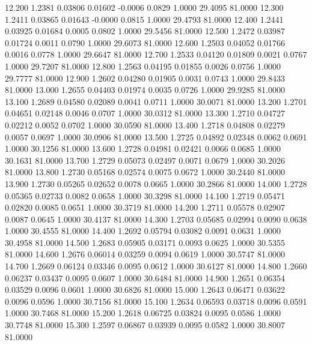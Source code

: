   12.200   1.2381   0.03806   0.01602  -0.0006   0.0829   1.0000  29.4095  81.0000
  12.300   1.2411   0.03865   0.01643  -0.0000   0.0815   1.0000  29.4793  81.0000
  12.400   1.2441   0.03925   0.01684   0.0005   0.0802   1.0000  29.5456  81.0000
  12.500   1.2472   0.03987   0.01724   0.0011   0.0790   1.0000  29.6073  81.0000
  12.600   1.2503   0.04052   0.01766   0.0016   0.0778   1.0000  29.6647  81.0000
  12.700   1.2533   0.04120   0.01809   0.0021   0.0767   1.0000  29.7207  81.0000
  12.800   1.2563   0.04195   0.01855   0.0026   0.0756   1.0000  29.7777  81.0000
  12.900   1.2602   0.04280   0.01905   0.0031   0.0743   1.0000  29.8433  81.0000
  13.000   1.2655   0.04403   0.01974   0.0035   0.0726   1.0000  29.9285  81.0000
  13.100   1.2689   0.04580   0.02089   0.0041   0.0711   1.0000  30.0071  81.0000
  13.200   1.2701   0.04651   0.02148   0.0046   0.0707   1.0000  30.0312  81.0000
  13.300   1.2710   0.04727   0.02212   0.0052   0.0702   1.0000  30.0590  81.0000
  13.400   1.2718   0.04808   0.02279   0.0057   0.0697   1.0000  30.0906  81.0000
  13.500   1.2725   0.04892   0.02348   0.0062   0.0691   1.0000  30.1256  81.0000
  13.600   1.2728   0.04981   0.02421   0.0066   0.0685   1.0000  30.1631  81.0000
  13.700   1.2729   0.05073   0.02497   0.0071   0.0679   1.0000  30.2026  81.0000
  13.800   1.2730   0.05168   0.02574   0.0075   0.0672   1.0000  30.2440  81.0000
  13.900   1.2730   0.05265   0.02652   0.0078   0.0665   1.0000  30.2866  81.0000
  14.000   1.2728   0.05365   0.02733   0.0082   0.0658   1.0000  30.3298  81.0000
  14.100   1.2719   0.05471   0.02820   0.0085   0.0651   1.0000  30.3719  81.0000
  14.200   1.2711   0.05578   0.02907   0.0087   0.0645   1.0000  30.4137  81.0000
  14.300   1.2703   0.05685   0.02994   0.0090   0.0638   1.0000  30.4555  81.0000
  14.400   1.2692   0.05794   0.03082   0.0091   0.0631   1.0000  30.4958  81.0000
  14.500   1.2683   0.05905   0.03171   0.0093   0.0625   1.0000  30.5355  81.0000
  14.600   1.2676   0.06014   0.03259   0.0094   0.0619   1.0000  30.5747  81.0000
  14.700   1.2669   0.06124   0.03346   0.0095   0.0612   1.0000  30.6127  81.0000
  14.800   1.2660   0.06237   0.03437   0.0095   0.0607   1.0000  30.6484  81.0000
  14.900   1.2651   0.06354   0.03529   0.0096   0.0601   1.0000  30.6826  81.0000
  15.000   1.2643   0.06471   0.03622   0.0096   0.0596   1.0000  30.7156  81.0000
  15.100   1.2634   0.06593   0.03718   0.0096   0.0591   1.0000  30.7468  81.0000
  15.200   1.2618   0.06725   0.03824   0.0095   0.0586   1.0000  30.7748  81.0000
  15.300   1.2597   0.06867   0.03939   0.0095   0.0582   1.0000  30.8007  81.0000
